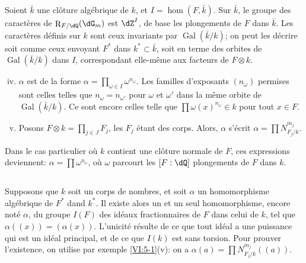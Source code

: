 \documentclass[oneside]{book}
\DeclareMathOperator{\gal}{Gal}
\DeclareMathOperator{\res}{R} %
\theoremstyle{sga-source}
\theoremstyle{sga-source-dash}
\theoremstyle{sga-source-dotdash}
\theoremstyle{sga-source-number-note-dash}
\theoremstyle{sga-source-note-number-dotdash}
\theoremstyle{sga-source-example-dotdash}
\theoremstyle{sga-source-inline-number}
\theoremstyle{sga-source-bare-number}
\theoremstyle{sga-source}
\newcommand{\PrintPage}[1]{}\newcommand{\MathPage}[1]{}\newcommand{\PrintCite}[2]{#1}\newcommand{\var}[3]{#1}
\begin{document}
Soient $\bar k$ une clôture algébrique de $k$, et $I=\hom(F,\bar k)$. Sur 
$\bar k$, le groupe des caractères de $\res_{F/\dQ}(\dG_m)$ est $\dZ^I$, de 
base les plongements de $F$ dans $\bar k$. Les caractères définis sur $k$ 
sont ceux invariants par $\gal(\bar k/k)$; on peut les décrire soit comme 
ceux envoyant $F^\ast$ dans $k^\ast\subset \bar k$, \var{soit en terme des orbites}{soit en termes des orbites}{S45-SOL-0866} de $\gal(\bar k/k)$ dans $I$, \var{correspondant elle-même}{correspondant elles-mêmes}{S45-SOL-0867} aux facteurs de 
$F\otimes k$. 
\begin{enumerate}[(i)]
\setcounter{enumi}{3}
  \item $\alpha$ est de la forme 
    $\alpha=\prod_{\omega\in I} \omega^{n_\omega}$. Les familles d'exposants 
    $(n_\omega)$ permises sont celles telles que $n_\omega=n_{\omega'}$ pour 
    $\omega$ et $\omega'$ dans la même orbite de $\gal(\bar k/k)$. Ce sont 
    encore \var{celles telle que}{celles telles que}{S45-SOL-0868} $\prod \omega(x)^{n_\omega}\in k$ pour tout 
    $x\in F$. 
  \PrintPage{209}
\item Posons $F\otimes k=\prod_{j\in J} F_j$, les $F_j$ étant des corps. 
    Alors, $\alpha$ s'écrit $\alpha=\prod N_{F_j/k}^{m_j}$. 
\end{enumerate}

Dans le cas particulier où $k$ contient une clôture normale de $F$, ces 
expressions deviennent: $\alpha=\prod \omega^{n_\omega}$, où $\omega$ 
parcourt les $[F:\dQ]$ plongements de $F$ dans $k$. 





\subsection{}\label{VI:5-2}

Supposons que $k$ soit un corps de nombres, et soit $\alpha$ un homomorphisme 
algébrique de \var{$F^\ast$ dand $k^\ast$}{$F^\ast$ dans $k^\ast$}{S45-SOL-0870}. Il existe alors un et un seul 
homomorphisme, encore noté $\alpha$, du groupe $I(F)$ des idéaux 
fractionnaires de $F$ dans celui de $k$, tel que $\alpha((x))=(\alpha(x))$. 
L'unicité résulte de ce que tout idéal a une puissance qui est un 
idéal principal, et de ce que $I(k)$ est sans torsion. Pour prouver 
l'existence, on utilise par exemple \ref{VI:5-1}(v): on a 
$\alpha(a) = \prod N_{F_j/k}^{m_j}((a))$. 
\end{document}
